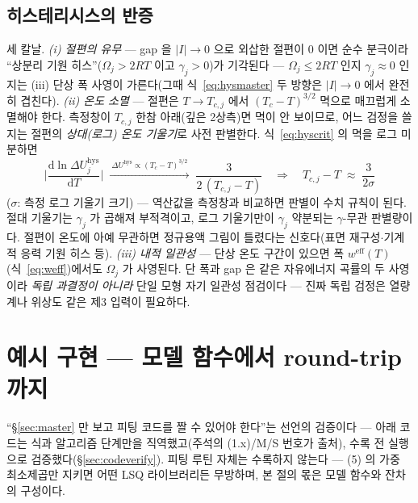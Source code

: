 \documentclass[11pt,a4paper]{article}
\newcommand{\dd}{\mathrm{d}}
\newcommand{\eff}{\mathrm{eff}}
\newcommand{\hys}{\mathrm{hys}}
\begin{document}
\subsection{히스테리시스의 반증}
세 칼날. \emph{(i) 절편의 유무} — gap 을 $|I|\to0$ 으로 외삽한 절편이 $0$ 이면 순수 분극이라 ``상분리 기원 히스''($\Omega_j>2RT$ 이고 $\gamma_j>0$)가 기각된다 — $\Omega_j\le2RT$ 인지 $\gamma_j\approx0$ 인지는 (iii) 단상 폭 사영이 가른다(그때 식~\eqref{eq:hysmaster} 두 방향은 $|I|\to0$ 에서 완전히 겹친다).
\emph{(ii) 온도 소멸} — 절편은 $T\to T_{c,j}$ 에서 $(T_c-T)^{3/2}$ 멱으로 매끄럽게 소멸해야 한다. 측정창이 $T_{c,j}$ 한참 아래(깊은 2상측)면 멱이 안 보이므로, 어느 검정을 쓸지는 절편의 \emph{상대(로그) 온도 기울기}로 사전 판별한다. 식~\eqref{eq:hyscrit} 의 멱을 로그 미분하면
\begin{equation}
\bigg|\frac{\dd\ln\Delta U_j^\hys}{\dd T}\bigg|
\;\xrightarrow{\ \Delta U^\hys\propto(T_{c}-T)^{3/2}\ }\;
\frac{3}{2\,(T_{c,j}-T)}
\quad\Longrightarrow\quad
T_{c,j}-T\;\approx\;\frac{3}{2\sigma}
\label{eq:logslopeT}
\end{equation}
($\sigma$: 측정 로그 기울기 크기) — 역산값을 측정창과 비교하면 판별이 수치 규칙이 된다. 절대 기울기는 $\gamma_j$ 가 곱해져 부적격이고, 로그 기울기만이 $\gamma_j$ 약분되는 $\gamma$-무관 판별량이다. 절편이 온도에 아예 무관하면 정규용액 그림이 틀렸다는 신호다(표면 재구성$\cdot$기계적 응력 기원 히스 등).
\emph{(iii) 내적 일관성} — 단상 온도 구간이 있으면 폭 $w^{\eff}(T)$(식~\eqref{eq:weff})에서도 $\Omega_j$ 가 사영된다. 단 폭과 gap 은 같은 자유에너지 곡률의 두 사영이라 \emph{독립 과결정이 아니라} 단일 모형 자기 일관성 점검이다 — 진짜 독립 검정은 열량계나 위상도 같은 제3 입력이 필요하다.

\section{예시 구현 — 모델 함수에서 round-trip 까지}\label{sec:code}
``\S\ref{sec:master} 만 보고 피팅 코드를 짤 수 있어야 한다''는 선언의 검증이다 — 아래 코드는 식과 알고리즘 단계만을 직역했고(주석의 (1.x)/M/S 번호가 출처), 수록 전 실행으로 검증했다(\S\ref{sec:codeverify}). 피팅 루틴 자체는 수록하지 않는다 — (5) 의 가중 최소제곱만 지키면 어떤 LSQ 라이브러리든 무방하며, 본 절의 몫은 모델 함수와 잔차의 구성이다.
\end{document}
